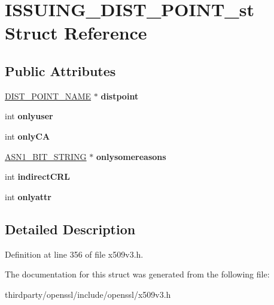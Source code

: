 \hypertarget{struct_i_s_s_u_i_n_g___d_i_s_t___p_o_i_n_t__st}{}\section{I\+S\+S\+U\+I\+N\+G\+\_\+\+D\+I\+S\+T\+\_\+\+P\+O\+I\+N\+T\+\_\+st Struct Reference}
\label{struct_i_s_s_u_i_n_g___d_i_s_t___p_o_i_n_t__st}
\subsection*{Public Attributes}
\begin{DoxyCompactItemize}
\item 
\mbox{\label{struct_i_s_s_u_i_n_g___d_i_s_t___p_o_i_n_t__st_aef98ad516a93a8eebe0f38f97515e434}} 
\hyperlink{struct_d_i_s_t___p_o_i_n_t___n_a_m_e__st}{D\+I\+S\+T\+\_\+\+P\+O\+I\+N\+T\+\_\+\+N\+A\+ME} $\ast$ {\bfseries distpoint}
\item 
\mbox{\label{struct_i_s_s_u_i_n_g___d_i_s_t___p_o_i_n_t__st_ad0d25508c76cac7e0d7f4bb0ac1d64d3}} 
int {\bfseries onlyuser}
\item 
\mbox{\label{struct_i_s_s_u_i_n_g___d_i_s_t___p_o_i_n_t__st_a12e9fbf6b321e3b7736e78ae24f89d72}} 
int {\bfseries only\+CA}
\item 
\mbox{\label{struct_i_s_s_u_i_n_g___d_i_s_t___p_o_i_n_t__st_a87b14dba5e51a2c4cdae476453725cec}} 
\hyperlink{structasn1__string__st}{A\+S\+N1\+\_\+\+B\+I\+T\+\_\+\+S\+T\+R\+I\+NG} $\ast$ {\bfseries onlysomereasons}
\item 
\mbox{\label{struct_i_s_s_u_i_n_g___d_i_s_t___p_o_i_n_t__st_a9872380cab3fa8a4d58ae149ca7bac16}} 
int {\bfseries indirect\+C\+RL}
\item 
\mbox{\label{struct_i_s_s_u_i_n_g___d_i_s_t___p_o_i_n_t__st_abbf8e7d0171fafc31d395b1804490ba5}} 
int {\bfseries onlyattr}
\end{DoxyCompactItemize}


\subsection{Detailed Description}


Definition at line 356 of file x509v3.\+h.



The documentation for this struct was generated from the following file\+:\begin{DoxyCompactItemize}
\item 
thirdparty/openssl/include/openssl/x509v3.\+h\end{DoxyCompactItemize}
